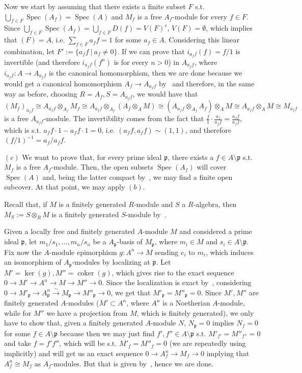 \documentclass{article}
\newcommand{\pid}{\mathfrak{p}}
\DeclareMathOperator{\Spec}{Spec}
\DeclareMathOperator{\coker}{coker}
\begin{document}
Now we start by assuming that there exists a finite subset $F$ s.t. $\bigcup_{f\in F}\Spec(A_f)=\Spec(A)$ and $M_f$ is a free $A_f$-module for every $f\in F$. Since $\bigcup_{f\in F}\Spec(A_f)=\bigcup_{f\in F} D(f)=V(F)^c$, $V(F)=\emptyset$, which implies that $(F)=A$, i.e. $\sum_{f\in F} a_ff=1$ for some $a_f\in A$. Considering this linear combination, let $F':=\{a_ff\ |\ a_f\neq 0\}$. If we can prove that $i_{a_ff}(f)=f/1$ is invertible (and therefore $i_{a_ff}(f^n)$ is for every $n>0$) in $A_{a_ff}$, where $i_{a_ff}:A\rightarrow A_{a_ff}$ is the canonical homomorphism, then we are done because we would get a canonical homomorphism $A_f\rightarrow A_{a_ff}$ by~\cite[prop. 3.1]{atm} and therefore, in the same way as before, choosing $R=A_f, S=A_{a_ff}$, we would have that $(M_f)_{a_ff}\cong A_{a_ff}\otimes_{A_f} M_f\cong A_{a_ff}\otimes_{A_f} (A_f\otimes_A M)\cong (A_{a_ff}\otimes_{A_f} A_f)\otimes_A M\cong A_{a_ff}\otimes_A M\cong M_{a_ff}$ is a free $A_{a_ff}$-module. The invertibility comes from the fact that $\frac{f}{1}\cdot\frac{a_f}{a_ff}=\frac{a_ff}{a_ff}$, which is s.t. $a_ff\cdot 1-a_ff\cdot 1=0$, i.e. $(a_ff,a_ff)\sim (1,1)$, and therefore $(f/1)^{-1}=a_f/a_ff$.

$(c)$ We want to prove that, for every prime ideal $\pid$, there exists a $f\in A\setminus\pid$ s.t. $M_f$ is a free $A_f$-module. Then, the open subsets $\Spec(A_f)$ will cover $\Spec(A)$ and, being the latter compact by~\cite[ex. 1.17(v)]{atm}, we may find a finite open subcover. At that point, we may apply $(b)$.

Recall that, if $M$ is a finitely generated $R$-module and $S$ a $R$-algebra, then $M_S:=S\otimes_R M$ is a finitely generated $S$-module by~\cite[prop. 2.17]{atm}.

Given a locally free and finitely generated $A$-module $M$ and considered a prime ideal $\pid$, let $m_1/s_1,\ldots,m_n/s_n$ be a $A_{\pid}$-basis of $M_{\pid}$, where $m_i\in M$ and $s_i\in A\setminus\pid$. Fix now the $A$-module epimorphism $g:A^n\rightarrow M$ sending $e_i$ to $m_i$, which induces an isomorphism of $A_{\pid}$-modules by localizing at $\pid$. Let $M'=\ker(g), M''=\coker(g)$, which gives rise to the exact sequence $0\rightarrow M'\rightarrow A^n\rightarrow M\rightarrow M''\rightarrow 0$. Since the localization is exact by~\cite[prop 3.3]{atm}, considering $0\rightarrow M'_{\pid}\rightarrow A_{\pid}^n\xrightarrow{\sim} M_{\pid}\rightarrow M''_{\pid}\rightarrow 0$, we get that $M'_{\pid}=M''_{\pid}=0$. Since $M',M''$ are finitely generated $A$-modules ($M'\subset A^n$, where $A^n$ is a Noetherian $A$-module, while for $M''$ we have a projection from $M$, which is finitely generated), we only have to show that, given a finitely generated $A$-module $N$, $N_{\pid}=0$ implies $N_f=0$ for some $f\in A\setminus\pid$ because then we may just find $f',f''\in A\setminus\pid$ s.t. $M'_{f'}=M''_{f''}=0$ and take $f=f'f''$, which will be s.t. $M'_f=M''_f=0$ (we are repeatedly using~\cite[ex. 3.1]{atm} implicitly) and will get us an exact sequence $0\rightarrow A_f^n\rightarrow M_f\rightarrow 0$ implying that $A_f^n\cong M_f$ as $A_f$-modules. But that is given by~\cite[ex. 3.1]{atm}, hence we are done.
\end{document}
